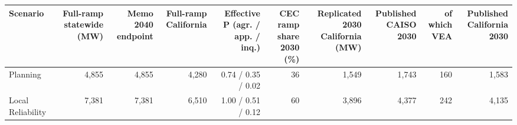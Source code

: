 \begin{tabular}{lrrrrrrrrr}
\toprule
Scenario & Full-ramp statewide (MW) & Memo 2040 endpoint & Full-ramp California & Effective P (agr. / app. / inq.) & CEC ramp share 2030 (\%) & Replicated 2030 California (MW) & Published CAISO 2030 & of which VEA & Published California 2030 \\
\midrule
Planning & 4,855 & 4,855 & 4,280 & 0.74 / 0.35 / 0.02 & 36 & 1,549 & 1,743 & 160 & 1,583 \\
Local Reliability & 7,381 & 7,381 & 6,510 & 1.00 / 0.51 / 0.12 & 60 & 3,896 & 4,377 & 242 & 4,135 \\
\bottomrule
\end{tabular}